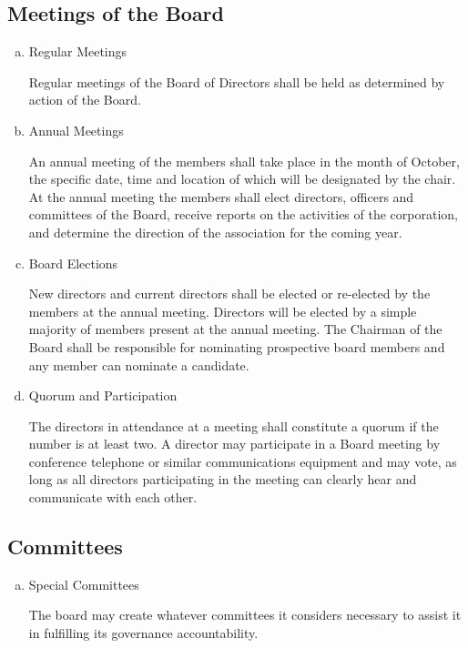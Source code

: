 \subsection{Meetings of the Board}
\begin{enumerate}[(a)]
\item Regular Meetings

Regular meetings of the Board of Directors shall be held as determined by action of the Board.

\item Annual Meetings

An annual meeting of the members shall take place in the month of October, the specific date, time and location of which will be designated by the chair. At the annual meeting the members shall elect directors, officers and committees of the Board, receive reports on the activities of the corporation, and determine the direction of the association for the coming year.

\item Board Elections

New directors and current directors shall be elected or re-elected by the members at the annual meeting. Directors will be elected by a simple majority of members present at the annual meeting. The Chairman of the Board shall be responsible for nominating prospective board members and any member can nominate a candidate. 

\item Quorum and Participation

The directors in attendance at a meeting shall constitute a quorum if the number is at least two. A director may participate in a Board meeting by conference telephone or similar communications equipment and may vote, as long as all directors participating in the meeting can clearly hear and communicate with each other.

\end{enumerate}

\subsection{Committees}
\begin{enumerate}[(a)]
\item Special Committees

The board may create whatever committees it considers necessary to assist it in fulfilling its governance accountability.

\end{enumerate}
    
    
    
    
    
    
    